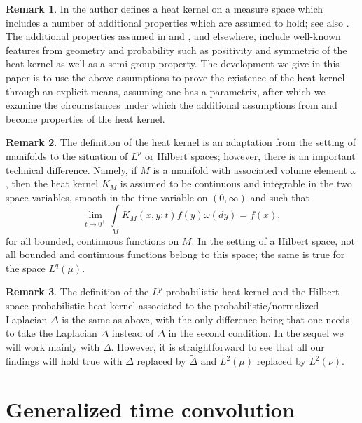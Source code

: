\documentclass[11pt,reqno]{amsart}
\theoremstyle{remark}
\theoremstyle{definition}
\newtheorem{remark}{Remark}
\numberwithin{theorem}{section} \numberwithin{equation}{section}
\begin{document}
\begin{remark}
In \cite{Gr03} the author defines a heat kernel on a measure space which includes a number of additional
properties which are assumed to hold; see also \cite{GHL14}.  The additional properties assumed in \cite{Gr03} and \cite{GHL14}, and
elsewhere, include well-known features from geometry and probability such as positivity and symmetric of the heat kernel as
well as a semi-group property.  The development we give in this paper is to use the above assumptions to prove the
existence of the heat kernel through an explicit means, assuming one has a parametrix,
after which we examine the circumstances under which the additional
assumptions from \cite{Gr03} and \cite{GHL14} become properties of the heat kernel.
\end{remark}

\begin{remark}
The definition of the heat kernel is an adaptation from the setting of manifolds to the situation of $L^p$ or Hilbert spaces;
however, there is an important technical difference.
Namely, if $M$ is a manifold with associated volume element $\omega$, then the heat kernel $K_M$ is assumed
to be continuous and integrable in the two space variables, smooth in the time variable on $(0,\infty)$ and such that
$$
\lim_{t\to0^+ } \int\limits_M K_M(x,y;t)f(y) \omega(dy)=f(x),
$$
for all bounded, continuous functions on $M$. In the setting of a Hilbert space, not all bounded and continuous
functions belong to this space; the same is true for the space $L^q(\mu)$.
\end{remark}

\begin{remark}
  The definition of the $L^p$-probabilistic heat kernel and the Hilbert space probabilistic heat kernel associated to the
  probabilistic/normalized Laplacian $\tilde\Delta$ is the same as above, with the only difference being  that one needs
  to take the Laplacian $\tilde\Delta$ instead of $\Delta$ in the second condition. In the sequel we will work mainly with
  $\Delta$. However, it is straightforward to see that all our findings will hold true with $\Delta$ replaced by $\tilde\Delta$
  and $L^2(\mu)$ replaced by $L^2(\nu)$.
\end{remark}



\section{Generalized time convolution}
\end{document}
